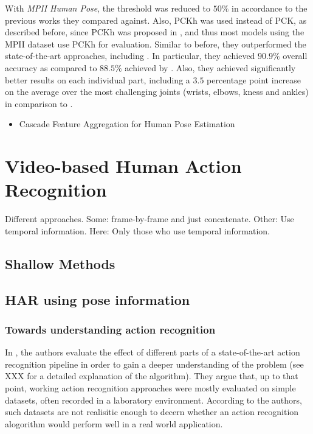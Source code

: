 With \textit{MPII Human Pose}, the threshold was reduced to $50\%$ in accordance to the previous works they compared against.
Also, PCKh was used instead of PCK, as described before, since PCKh was proposed in \cite{andriluka_2d_2014}, and thus most models using the MPII dataset use PCKh for evaluation.
Similar to before, they outperformed the state-of-the-art approaches, including \cite{wei_convolutional_2016}.
In particular, they achieved $90.9\%$ overall accuracy as compared to $88.5\%$ achieved by \cite{wei_convolutional_2016}.
Also, they achieved significantly better results on each individual part, including a $3.5$ percentage point increase on the average over the most challenging joints (wrists, elbows, kness and ankles) in comparison to \cite{wei_convolutional_2016}. 

\begin{itemize}
    \item Cascade Feature Aggregation for Human Pose Estimation \cite{su_cascade_2019}
\end{itemize}

\section{Video-based Human Action Recognition}

Different approaches.
Some: frame-by-frame and just concatenate.
Other: Use temporal information.
Here: Only those who use temporal information.

\subsection{Shallow Methods}

\subsection{HAR using pose information}
\label{sec:jhuang-towards}
\subsubsection{Towards understanding action recognition}
In \cite{jhuang_towards_2013}, the authors evaluate the effect of different parts of a state-of-the-art action recognition pipeline \cite{wang_dense_2013} in order to gain a deeper understanding of the problem (see XXX for a detailed explanation of the algorithm). %
They argue that, up to that point, working action recognition approaches were mostly evaluated on simple datasets, often recorded in a laboratory environment.
According to the authors, such datasets are not realisitic enough to decern whether an action recognition alogorithm would perform well in a real world application.

